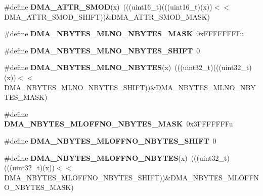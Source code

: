 \begin{DoxyCompactItemize}
\item 
\#define {\bfseries D\+M\+A\+\_\+\+A\+T\+T\+R\+\_\+\+S\+M\+OD}(x)~(((uint16\+\_\+t)(((uint16\+\_\+t)(x))$<$$<$D\+M\+A\+\_\+\+A\+T\+T\+R\+\_\+\+S\+M\+O\+D\+\_\+\+S\+H\+I\+FT))\&D\+M\+A\+\_\+\+A\+T\+T\+R\+\_\+\+S\+M\+O\+D\+\_\+\+M\+A\+SK)\hypertarget{group__DMA__Register__Masks_ga820fb5655da874e3672c8608b18ecfc9}{}\label{group__DMA__Register__Masks_ga820fb5655da874e3672c8608b18ecfc9}

\item 
\#define {\bfseries D\+M\+A\+\_\+\+N\+B\+Y\+T\+E\+S\+\_\+\+M\+L\+N\+O\+\_\+\+N\+B\+Y\+T\+E\+S\+\_\+\+M\+A\+SK}~0x\+F\+F\+F\+F\+F\+F\+F\+Fu\hypertarget{group__DMA__Register__Masks_ga5898074fa37efdc15af6621cd8daa450}{}\label{group__DMA__Register__Masks_ga5898074fa37efdc15af6621cd8daa450}

\item 
\#define {\bfseries D\+M\+A\+\_\+\+N\+B\+Y\+T\+E\+S\+\_\+\+M\+L\+N\+O\+\_\+\+N\+B\+Y\+T\+E\+S\+\_\+\+S\+H\+I\+FT}~0\hypertarget{group__DMA__Register__Masks_ga98cb66e15329c07a5b38d3d10c0d3dbe}{}\label{group__DMA__Register__Masks_ga98cb66e15329c07a5b38d3d10c0d3dbe}

\item 
\#define {\bfseries D\+M\+A\+\_\+\+N\+B\+Y\+T\+E\+S\+\_\+\+M\+L\+N\+O\+\_\+\+N\+B\+Y\+T\+ES}(x)~(((uint32\+\_\+t)(((uint32\+\_\+t)(x))$<$$<$D\+M\+A\+\_\+\+N\+B\+Y\+T\+E\+S\+\_\+\+M\+L\+N\+O\+\_\+\+N\+B\+Y\+T\+E\+S\+\_\+\+S\+H\+I\+FT))\&D\+M\+A\+\_\+\+N\+B\+Y\+T\+E\+S\+\_\+\+M\+L\+N\+O\+\_\+\+N\+B\+Y\+T\+E\+S\+\_\+\+M\+A\+SK)\hypertarget{group__DMA__Register__Masks_ga955150e5aaff65cceeb0e2fb0f08d6c6}{}\label{group__DMA__Register__Masks_ga955150e5aaff65cceeb0e2fb0f08d6c6}

\item 
\#define {\bfseries D\+M\+A\+\_\+\+N\+B\+Y\+T\+E\+S\+\_\+\+M\+L\+O\+F\+F\+N\+O\+\_\+\+N\+B\+Y\+T\+E\+S\+\_\+\+M\+A\+SK}~0x3\+F\+F\+F\+F\+F\+F\+Fu\hypertarget{group__DMA__Register__Masks_ga7c3faf561a42d91448404d94823535ff}{}\label{group__DMA__Register__Masks_ga7c3faf561a42d91448404d94823535ff}

\item 
\#define {\bfseries D\+M\+A\+\_\+\+N\+B\+Y\+T\+E\+S\+\_\+\+M\+L\+O\+F\+F\+N\+O\+\_\+\+N\+B\+Y\+T\+E\+S\+\_\+\+S\+H\+I\+FT}~0\hypertarget{group__DMA__Register__Masks_ga0ce6afd8f00fcbe8d7dee4fcefa8ffdf}{}\label{group__DMA__Register__Masks_ga0ce6afd8f00fcbe8d7dee4fcefa8ffdf}

\item 
\#define {\bfseries D\+M\+A\+\_\+\+N\+B\+Y\+T\+E\+S\+\_\+\+M\+L\+O\+F\+F\+N\+O\+\_\+\+N\+B\+Y\+T\+ES}(x)~(((uint32\+\_\+t)(((uint32\+\_\+t)(x))$<$$<$D\+M\+A\+\_\+\+N\+B\+Y\+T\+E\+S\+\_\+\+M\+L\+O\+F\+F\+N\+O\+\_\+\+N\+B\+Y\+T\+E\+S\+\_\+\+S\+H\+I\+FT))\&D\+M\+A\+\_\+\+N\+B\+Y\+T\+E\+S\+\_\+\+M\+L\+O\+F\+F\+N\+O\+\_\+\+N\+B\+Y\+T\+E\+S\+\_\+\+M\+A\+SK)\hypertarget{group__DMA__Register__Masks_ga6ade3a2121a12d70dd34e978f92465e3}{}\label{group__DMA__Register__Masks_ga6ade3a2121a12d70dd34e978f92465e3}


\end{DoxyCompactItemize}

